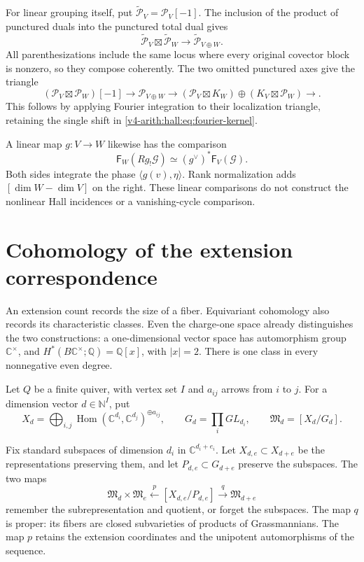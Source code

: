 For linear grouping itself, put
$\widetilde{\mathcal P}_V=\mathcal P_V[-1]$.
The inclusion of the product of punctured duals into the punctured
total dual gives
\[
 \widetilde{\mathcal P}_V\boxtimes\widetilde{\mathcal P}_W
 \longrightarrow\widetilde{\mathcal P}_{V\oplus W}.
\]
All parenthesizations include the same locus where every original
covector block is nonzero, so they compose coherently.
The two omitted punctured axes give the triangle
\[
 (\mathcal P_V\boxtimes\mathcal P_W)[-1]
 \longrightarrow\mathcal P_{V\oplus W}
 \longrightarrow
 (\mathcal P_V\boxtimes K_W)\oplus(K_V\boxtimes\mathcal P_W)
 \longrightarrow.
\]
This follows by applying Fourier integration to their localization
triangle, retaining the single shift in
\eqref{v4-arith:hall:eq:fourier-kernel}.

A linear map $g:V\to W$ likewise has the comparison
\[
 \mathsf F_W(Rg_!\mathcal G)
 \simeq(g^\vee)^*\mathsf F_V(\mathcal G).
\]
Both sides integrate the phase $\langle g(v),\eta\rangle$.
Rank normalization adds $[\dim W-\dim V]$ on the right.
These linear comparisons do not construct the nonlinear Hall
incidences or a vanishing-cycle comparison.

\section{Cohomology of the extension correspondence}
\label{v4-arith:hall:sec:coha}

An extension count records the size of a fiber. Equivariant cohomology
also records its characteristic classes. Even the charge-one space
already distinguishes the two constructions: a one-dimensional vector
space has automorphism group $\mathbb C^\times$, and
$H^*(B\mathbb C^\times;\mathbb Q)=\mathbb Q[x]$, with $|x|=2$.
There is one class in every nonnegative even degree.

Let $Q$ be a finite quiver, with vertex set $I$ and $a_{ij}$ arrows
from $i$ to $j$. For a dimension vector $d\in\mathbb N^I$, put
\[
 X_d=\bigoplus_{i,j}\operatorname{Hom}(\mathbb C^{d_i},
                   \mathbb C^{d_j})^{\oplus a_{ij}},\qquad
 G_d=\prod_i GL_{d_i},\qquad \mathfrak M_d=[X_d/G_d].
\]

Fix standard subspaces of dimension $d_i$ in $\mathbb C^{d_i+e_i}$.
Let $X_{d,e}\subset X_{d+e}$ be the representations preserving them,
and let $P_{d,e}\subset G_{d+e}$ preserve the subspaces. The two maps
\[
 \mathfrak M_d\times\mathfrak M_e
 \xleftarrow{\ p\ }[X_{d,e}/P_{d,e}]
 \xrightarrow{\ q\ }\mathfrak M_{d+e}
\]
remember the subrepresentation and quotient, or forget the subspaces.
The map $q$ is proper: its fibers are closed subvarieties of products
of Grassmannians. The map $p$ retains the extension coordinates and
the unipotent automorphisms of the sequence.


